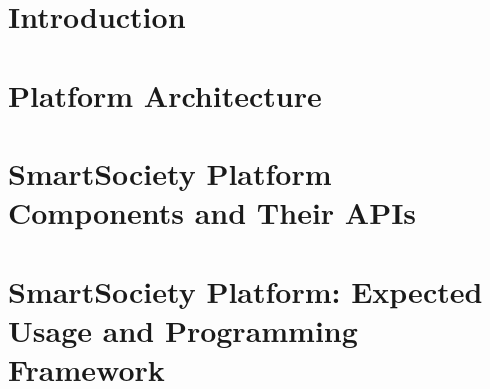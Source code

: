 \documentclass{SmartReport}
\begin{document}
\newpage


\section{Introduction}
\label{sec:intro}


\newpage


\section{Platform Architecture}
\label{sec:arch}

\newpage

% 

% 


\section{SmartSociety Platform Components and Their APIs}
\label{sec:sw}

\newpage


\section{SmartSociety Platform: Expected Usage and Programming Framework}
\label{sec:usage}

\end{document}
